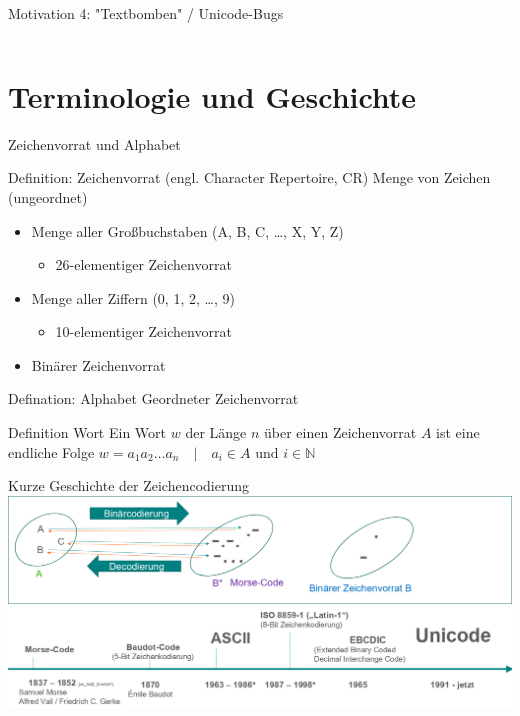 \documentclass[xelatex,aspectratio=169]{beamer}
\begin{document}
\begin{frame}{Motivation 4: "Textbomben" / Unicode-Bugs}
\begin{columns}
\begin{column}{0.5\textwidth}
        \end{column}
    \end{columns}
\end{frame}

\section{Terminologie und Geschichte}

\begin{frame}{Zeichenvorrat und Alphabet}
    \begin{block}{Definition: Zeichenvorrat (engl. Character Repertoire, CR)}
        Menge von Zeichen (ungeordnet)
        \begin{itemize}
            \item Menge aller Großbuchstaben (A, B, C, \dots, X, Y, Z)
                  \begin{itemize}
                      \item 26-elementiger Zeichenvorrat
                  \end{itemize}
            \item Menge aller Ziffern (0, 1, 2, \dots, 9)
                  \begin{itemize}
                      \item 10-elementiger Zeichenvorrat
                  \end{itemize}
            \item Binärer Zeichenvorrat
        \end{itemize}
    \end{block}
    \begin{block}{Defination: Alphabet}
        Geordneter Zeichenvorrat
    \end{block}
    \begin{block}{Definition Wort}
        Ein Wort $w$ der Länge $n$ über einen Zeichenvorrat $A$ ist eine endliche Folge $w = a_1 a_2 \ldots a_n \quad \vert \quad a_i \in A \mbox{ und } i \in \mathbb{N}$
    \end{block}
\end{frame}


\begin{frame}{Kurze Geschichte der Zeichencodierung}
    \includegraphics[width=\textwidth]{img/codierung_morsecode.png}
    \includegraphics[width=\textwidth]{img/codierung_zeitstrahl.png}
\end{frame}
\end{document}
